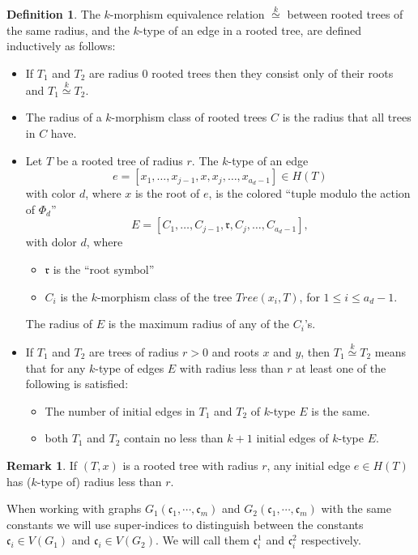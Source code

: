 \documentclass[11pt,notitlepage]{report}
\theoremstyle{definition}
\newtheorem{definition}{Definition}[chapter]
\newtheorem{remark}{Remark}[chapter]
\newcommand{\cc}{\mathfrak{c}}
\newcommand{\clist}{\mathfrak{c}_{1}, \cdots, \mathfrak{c}_m}
\newcommand{\morph}[1]{\stackrel{#1}{\simeq}}
\begin{document}
\begin{definition} 
	The $k$-morphism equivalence relation $\morph{k}$ between rooted trees
	of the same radius,
	and the $k$-type of an edge in a rooted tree,
	are defined inductively as follows:
	
	\begin{itemize}
		\item If $T_1$ and $T_2$ are radius $0$ rooted trees then they consist only of their roots and $T_1\morph{k} T_2$. 
		\item The radius of a $k$-morphism class of rooted trees $C$
		is the radius that all trees in $C$ have.
		\item Let $T$ be a rooted tree of radius $r$. The $k$-type
		of an edge 
		\[e=[x_1,\dots, x_{j-1}, x ,x_j, \dots, x_{a_d-1}]\in H(T)\]
		with color $d$, where $x$ is the root of $e$, is the colored 
		``tuple modulo the action of $\Phi_d$'' 
		\[E=[C_1,\dots, C_{j-1}, \mathfrak{r}, C_j,\dots, C_{a_d -1}]
		,\]
		with dolor $d$, where
		\begin{itemize}
			\item $\mathfrak{r}$ is the ``root symbol''
			\item $C_i$ is the $k$-morphism class of the tree
			$Tree(x_i,T)$, for $1\leq i \leq a_d-1$.
		\end{itemize} 
		The radius of $E$ is the maximum radius of any of the
		$C_i$'s.  
		
		\item If $T_1$ and $T_2$ are trees of radius $r>0$ and roots $x$ and $y$, then $T_1\morph{k} T_2$ means that for any $k$-type of edges $E$
		with radius less than $r$ at least one of the following is satisfied:
		\begin{itemize}
			\item The number of initial edges in $T_1$ and $T_2$ of $k$-type $E$ 
			is the same.
			\item both $T_1$ and $T_2$ contain no less than $k+1$
			initial edges of $k$-type $E$. 
		\end{itemize}
	\end{itemize}
\end{definition}

\begin{remark}
	If $(T,x)$ is a rooted tree with radius 
	$r$, any initial edge $e\in H(T)$ has ($k$-type
	of) radius less than $r$.
\end{remark}

When working with graphs $G_1(\clist)$ and $G_2(\clist)$ with the 
same constants we will use super-indices to distinguish between the
constants $\cc_i\in V(G_1)$ and $\cc_i \in V(G_2)$. We will call them
$\cc_i^1$ and $\cc_i^2$ respectively.   
\end{document}

